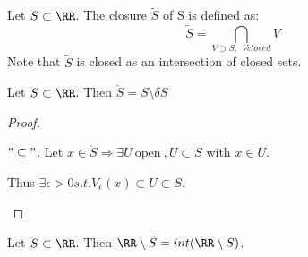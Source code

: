 \documentclass[11pt]{scrartcl}
\begin{document}
\begin{definition}
  Let $S \subset \RR$. The \ul{closure} $\tilde{S}$ of S is defined as:
  $$ \tilde{S} = \bigcap_{V \supset S, \ \ V closed} V $$
  Note that $\tilde{S}$ is closed as an intersection of closed sets.
\end{definition}

\begin{theorem}
  Let $S \subset \RR$. Then $\mathring{S} = S \setminus \delta S$
  \begin{proof}
    \begin{enumerate}
      \ii
      $"\subseteq"$. Let $x \in \mathring{S} \Rightarrow \exists U \ \text{open} \ , U \subset S$ with $x \in U$.

      Thus $\exists \epsilon > 0 s.t. V_{\epsilon}(x) \subset U \subset S$.
    \end{enumerate}
  \end{proof}
\end{theorem}

\begin{theorem}
  Let $S \subset \RR$. Then $\RR \setminus \tilde{S} = int(\RR \setminus S)$.
\end{theorem}
\end{document}
